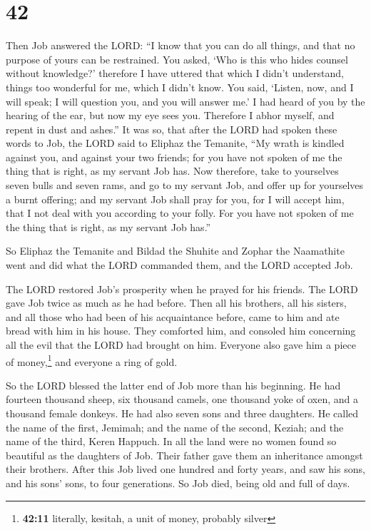 \hypertarget{section-24}{%
\section{42}\label{section-24}}

 Then Job answered the LORD:  ``I know that
you can do all things, and that no purpose of yours can be restrained.
 You asked, `Who is this who hides counsel without
knowledge?' therefore I have uttered that which I didn't understand,
things too wonderful for me, which I didn't know.  You
said, `Listen, now, and I will speak; I will question you, and you will
answer me.'  I had heard of you by the hearing of the ear,
but now my eye sees you.  Therefore I abhor myself, and
repent in dust and ashes.''  It was so, that after the
LORD had spoken these words to Job, the LORD said to Eliphaz the
Temanite, ``My wrath is kindled against you, and against your two
friends; for you have not spoken of me the thing that is right, as my
servant Job has.  Now therefore, take to yourselves seven
bulls and seven rams, and go to my servant Job, and offer up for
yourselves a burnt offering; and my servant Job shall pray for you, for
I will accept him, that I not deal with you according to your folly. For
you have not spoken of me the thing that is right, as my servant Job
has.''

 So Eliphaz the Temanite and Bildad the Shuhite and Zophar
the Naamathite went and did what the LORD commanded them, and the LORD
accepted Job.

 The LORD restored Job's prosperity when he prayed for
his friends. The LORD gave Job twice as much as he had before.
 Then all his brothers, all his sisters, and all those
who had been of his acquaintance before, came to him and ate bread with
him in his house. They comforted him, and consoled him concerning all
the evil that the LORD had brought on him. Everyone also gave him a
piece of money,\footnote{\textbf{42:11} literally, kesitah, a unit of
  money, probably silver} and everyone a ring of gold.

 So the LORD blessed the latter end of Job more than his
beginning. He had fourteen thousand sheep, six thousand camels, one
thousand yoke of oxen, and a thousand female donkeys.  He
had also seven sons and three daughters.  He called the
name of the first, Jemimah; and the name of the second, Keziah; and the
name of the third, Keren Happuch.  In all the land were
no women found so beautiful as the daughters of Job. Their father gave
them an inheritance amongst their brothers.  After this
Job lived one hundred and forty years, and saw his sons, and his sons'
sons, to four generations.  So Job died, being old and
full of days.

